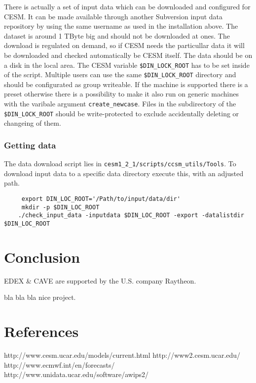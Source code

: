 \documentclass[]{article}
\begin{document}
There is actually a set of input data which can be downloaded and
configured for CESM. It can be made available through another Subversion
input data repository by using the same username as used in the
installation above. The dataset is around 1 TByte big and should not be
downloaded at ones. The download is regulated on demand, so if CESM
needs the particullar data it will be downloaded and checked
automatically be CESM itself. The data should be on a disk in the local
area. The CESM variable \texttt{\$DIN\_LOCK\_ROOT} has to be set inside
of the script. Multiple users can use the same
\texttt{\$DIN\_LOCK\_ROOT} directory and should be configurated as group
writeable. If the machine is supported there is a preset otherwise there
is a possibility to make it also run on generic machines with the
varibale argument \texttt{create\_newcase}. Files in the subdirectory of
the \texttt{\$DIN\_LOCK\_ROOT} should be write-protected to exclude
accidentally deleting or changeing of them.

\subsubsection{Getting data}\label{getting-data}

The data download script lies in
\texttt{cesm1\_2\_1/scripts/ccsm\_utils/Tools}. To download input data
to a specific data directory execute this, with an adjusted path.

\begin{verbatim}
     export DIN_LOC_ROOT='/Path/to/input/data/dir'
     mkdir -p $DIN_LOC_ROOT
    ./check_input_data -inputdata $DIN_LOC_ROOT -export -datalistdir $DIN_LOC_ROOT       
\end{verbatim}

\section{Conclusion}\label{conclusion}

EDEX \& CAVE are supported by the U.S. company Raytheon.

bla bla bla nice project.

\section{References}\label{references}

http://www.cesm.ucar.edu/models/current.html http://www2.cesm.ucar.edu/
http://www.ecmwf.int/en/forecasts/
http://www.unidata.ucar.edu/software/awips2/
\end{document}
